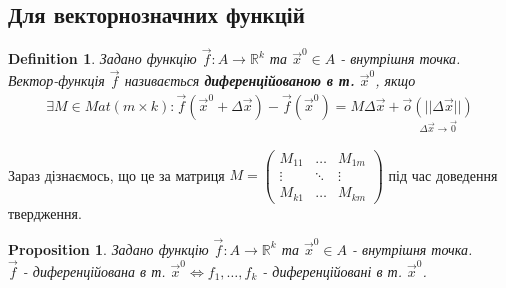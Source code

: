 \documentclass[a4paper, 10pt]{article}
\theoremstyle{theoremdd}
\theoremstyle{theoremdd}
\theoremstyle{theoremdd}
\newtheorem{definition}[theorem]{Definition}
\theoremstyle{theoremdd}
\theoremstyle{theoremdd}
\theoremstyle{theoremdd}
\newtheorem{proposition}[theorem]{Proposition}
\theoremstyle{theoremdd}
\theoremstyle{theoremdd}
\theoremstyle{theoremdd}
\begin{document}
\subsection{Для векторнозначних функцій}
\begin{definition}
Задано функцію $\vec{f}: A \to \mathbb{R}^k$ та $\vec{x}^0 \in A$ - внутрішня точка.\\
Вектор-функція $\vec{f}$ називається \textbf{диференційованою в т.} $\vec{x}^0$, якщо
\begin{align*}
\exists M \in Mat(m \times k): \vec{f}(\vec{x}^0 + \Delta \vec{x}) - \vec{f}(\vec{x}^0) = M \Delta \vec{x} + \underset{\Delta \vec{x} \to \vec{0}}{\vec{o}(||\Delta \vec{x}||)}
\end{align*}
\end{definition}
Зараз дізнаємось, що це за матриця $M = \begin{pmatrix}
M_{11} & \dots & M_{1m} \\
\vdots & \ddots & \vdots \\
M_{k1} & \dots & M_{km}
\end{pmatrix}$ під час доведення твердження.

\begin{proposition}
Задано функцію $\vec{f}: A \to \mathbb{R}^k$ та $\vec{x}^0 \in A$ - внутрішня точка.\\
$\vec{f}$ - диференційована в т. $\vec{x}^0 \iff f_1,\dots,f_k$ - диференційовані в т. $\vec{x}^0$.
\end{proposition}
\end{document}
